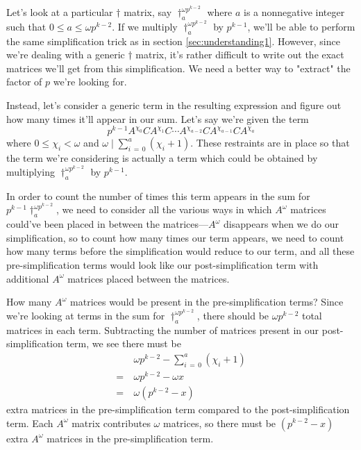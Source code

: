 \documentclass[a4paper, 12pt, reqno]{amsart}
\begin{document}
		Let's look at a particular $\dag$ matrix, say $\dag_a^{\omega p^{k-2}}$ where $a$ is a nonnegative integer such that $0 \leq a \leq \omega p^{k-2}$. If we multiply
		$\dag_a^{\omega p^{k-2}}$ by $p^{k-1}$, we'll be able to perform the same simplification trick as in section \ref{sec:understanding1}. However, since we're dealing
		with a generic $\dag$ matrix, it's rather difficult to write out the exact matrices we'll get from this simplification. We need a better way to "extract" the factor
		of $p$ we're looking for.
		
		Instead, let's consider a generic term in the resulting expression and figure out how many times it'll appear in our sum. Let's say we're given the term
		\[
			p^{k-1}A^{\chi_0}CA^{\chi_1}C\cdots A^{\chi_{a-2}}CA^{\chi_{a-1}}CA^{\chi_a}
		\]
		where $0 \leq \chi_i < \omega$ and $\omega \mid \sum_{i\,=\,0}^a (\chi_i + 1)$. These restraints are in place so that the term we're considering is actually a term 
		which could be obtained by multiplying $\dag_a^{\omega p^{k-2}}$ by $p^{k-1}$.
		
		In order to count the number of times this term appears in the sum for $p^{k-1}\dag_a^{\omega p^{k-2}}$, we need to consider all the various ways in which 
		$A^\omega$ matrices could've been placed in between the matrices---$A^\omega$ disappears when we do our simplification, so to count how many times our term appears, 
		we need to count how many terms before the simplification would reduce to our term, and all these pre-simplification terms would look like our post-simplification 
		term with additional $A^\omega$ matrices placed between the matrices.
		
		How many $A^\omega$ matrices would be present in the pre-simplification terms? Since we're looking at terms in the sum for $\dag_a^{\omega p^{k-2}}$, there should be
		$\omega p^{k-2}$ total matrices in each term. Subtracting the number of matrices present in our post-simplification term, we see there must be
		\begin{align*}
			 & \ \omega p^{k-2} - \sum_{i\,=\,0}^a (\chi_i + 1) \\
			=& \ \omega p^{k-2} - \omega x                      \\
			=& \ \omega(p^{k-2} - x)
		\end{align*}
		extra matrices in the pre-simplification term compared to the post-simplification term. Each $A^\omega$ matrix contributes $\omega$ matrices, so there must be
		$(p^{k-2} - x)$ extra $A^\omega$ matrices in the pre-simplification term.
		
\end{document}
